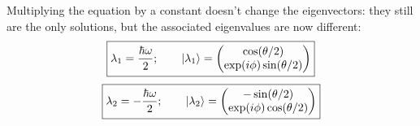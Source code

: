 \documentclass[solutions.tex]{subfiles}
\begin{document}
Multiplying the equation by a constant doesn't change the eigenvectors:
they still are the only solutions, but the associated eigenvalues are
now different:
\[
	\boxed{\lambda_1 = \frac{\hbar\omega}2;\qquad
		|\lambda_1\rangle = \begin{pmatrix}
		\cos(\theta/2) \\
		\exp(i\phi)\sin(\theta/2) \\
	\end{pmatrix}}
\]\[
	\boxed{\lambda_2 = -\frac{\hbar\omega}2;\qquad
		|\lambda_2\rangle = \begin{pmatrix}
		-\sin(\theta/2) \\
		\exp(i\phi)\cos(\theta/2) \\
	\end{pmatrix}}
\]
\end{document}
